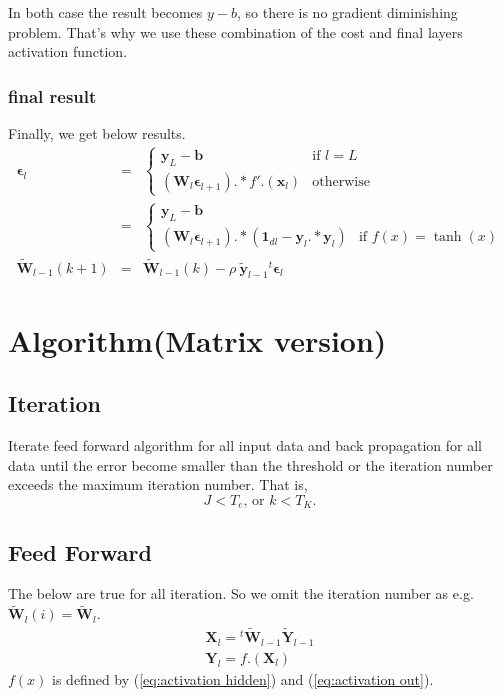 \documentclass{article}
\begin{document}
In both case the result becomes $y-b$, so there is no gradient
diminishing problem. That's why we use these combination of the cost and
final layers activation function. 

\subsubsection{final result}
Finally, we get below results.
\begin{eqnarray}
  \bm{\epsilon}_l &=&
  \begin{cases}
    \bm{y}_L - \bm{b}  &\mbox{if } l=L \\
    (\bm{W}_l\bm{\epsilon}_{l+1}) .* f'.(\bm{x}_l) &\mbox{otherwise}
  \end{cases} \\
  &=& 
  \begin{cases}
    \bm{y}_L - \bm{b}\\
    (\bm{W}_l \bm{\epsilon}_{l+1}).*(\bm{1}_{dl}-\bm{y}_l.*\bm{y}_l)  &\mbox{if } f(x)=\tanh(x)
  \end{cases} \\
  \bm{\tilde{W}}_{l-1}(k+1) &=& \bm{\tilde{W}}_{l-1}(k) - \rho\ \bm{\tilde{y}}_{l-1}{}^t\bm{\epsilon}_l
\end{eqnarray}


\section{Algorithm(Matrix version)}
\subsection{Iteration}
Iterate feed forward algorithm for all input
data and back propagation for all data until the error become smaller than the threshold or the
iteration number exceeds the
maximum iteration number. 
That is, 
\begin{equation}
  J < T_e \mbox{, or } k < T_K.
\end{equation}

\subsection{Feed Forward}
The below are true for all iteration.
So we omit the iteration number as 
e.g.\ $\bm{\tilde{W}}_l(i) = \bm{\tilde{W}}_l$.
\begin{eqnarray}
  \bm{X}_l = {}^t\bm{\tilde{W}}_{l-1} \bm{\tilde{Y}}_{l-1} \\
  \bm{Y}_l = f.(\bm{X}_l) 
\end{eqnarray}
$f(x)$ is defined by (\ref{eq:activation hidden}) and (\ref{eq:activation
out}).
\end{document}
